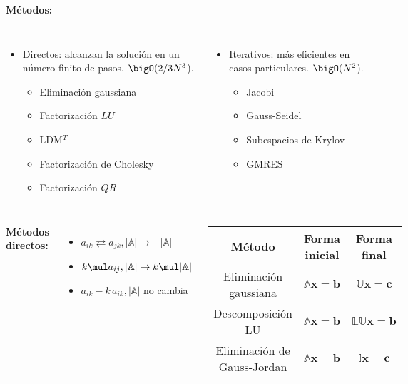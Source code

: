 \documentclass[9pt, aspectratio=169]{beamer}
\begin{document}
\begin{frame}
\textbf{Métodos:}
\begin{columns}[t]
\begin{itemize}
    \item Directos: alcanzan la solución en un número finito de pasos. $\bigO(2/3N^3$).
        \begin{itemize}
            \item Eliminación gaussiana
            \item Factorización $LU$
            \item LDM$^T$
            \item Factorización de Cholesky
            \item Factorización $QR$
        \end{itemize}
\end{itemize}
\begin{itemize}
    \item Iterativos: más eficientes en casos particulares. $\bigO(N^2$).
        \begin{itemize}
            \item Jacobi
            \item Gauss-Seidel
            \item Subespacios de Krylov
            \item GMRES
        \end{itemize}
\end{itemize}
\end{columns}
\pause

\hrulefill \vspace{1em}
\begin{columns}[c]
\textbf{Métodos directos:}
\begin{itemize}
    \item $a_{ik} \rightleftarrows a_{jk}, |\mathbb{A}| \rightarrow -|\mathbb{A}|$
    \item $k \mul a_{ij}, |\mathbb{A}| \rightarrow k \mul |\mathbb{A}|$
    \item $a_{ik} - k \, a_{ik}, |\mathbb{A}|$ no cambia
\end{itemize} \pause
{}
 \begin{center}
\begin{tabular}{c c c}
\toprule
\textbf{Método} & \textbf{Forma inicial} & \textbf{Forma final} \\
\midrule
Eliminación gaussiana & $\mathbb{A} \mathbf{x} = \mathbf{b}$ & $\mathbb{U} \mathbf{x} = \mathbf{c}$ \\
Descomposición LU & $\mathbb{A} \mathbf{x} = \mathbf{b}$ & $ \mathbb{LU} \mathbf{x} = \mathbf{b}$ \\
Eliminación de Gauss-Jordan & $\mathbb{A} \mathbf{x} = \mathbf{b}$ & $\mathbb{I} \mathbf{x} = \mathbf{c}$ \\
\bottomrule
\end{tabular} 
\end{center}
\end{columns} 


\end{frame}
\end{document}
